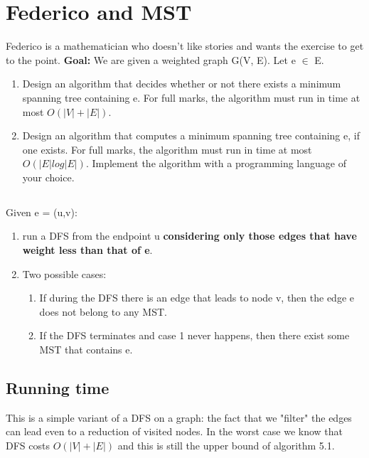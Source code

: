 \documentclass[12pt]{article}
\begin{document}
\section{}
\section{}
\section{Federico and MST}
Federico is a mathematician who doesn't like stories and wants the exercise to get to the point.
\newline
\textbf{Goal:} We are given a weighted graph G(V, E). Let e $\in$ E.
\begin{enumerate}
	\item Design an algorithm that decides whether or not there exists a minimum spanning tree containing e. For full marks, the algorithm must run in time at most $O(|V | + |E|)$.
	\item Design an algorithm that computes a minimum spanning tree containing e, if one exists. For full marks, the algorithm must run in time at most $O(|E| log |E|)$. Implement the algorithm with a programming language of your choice.

\end{enumerate}
\subsection{}
Given e = (u,v):
\begin{enumerate}
	\item run a DFS from the endpoint u \textbf{considering only those edges that have weight less than that of e}.
	\item Two possible cases:
	\begin{enumerate}
		\item If during the DFS there is an edge that leads to node v, then the edge e does not belong to any MST.
		\item If the DFS terminates and case 1 never happens, then there exist some MST that contains e.
	\end{enumerate}
\end{enumerate}

\subsection*{Running time}
This is a simple variant of a DFS on a graph: the fact that we "filter" the edges can lead even to a reduction of visited nodes. In the worst case we know that DFS costs $O(|V| + |E|)$ and this is still the upper bound of algorithm 5.1.
\end{document}
